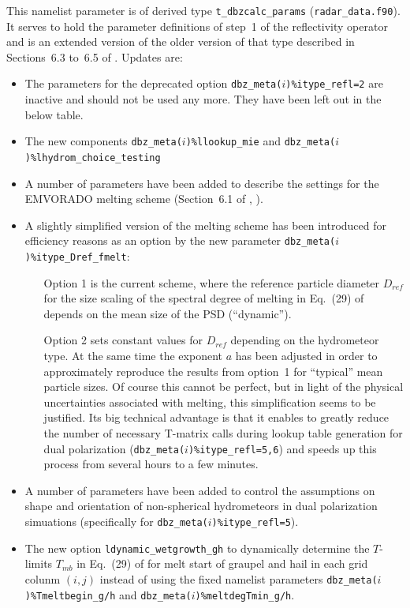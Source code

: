 \documentclass[10pt,a4paper,twoside,headinclude,footinclude,parskip=half]{scrartcl}
\newcommand{\citeP}[1]{\citet{#1}}
\newcommand{\citeNPK}[1]{\citeauthor{#1}, \citeyear{#1}}
\newcommand{\srcform}[1]{\mbox{\texttt{#1}}\xspace}%
\newcommand{\paramform}[1]{\mbox{\texttt{#1}}\xspace}%
\begin{document}
This namelist parameter is of derived type \srcform{t_dbzcalc_params} (\srcform{radar_data.f90}). It serves to hold the parameter definitions of step~1 of the reflectivity operator and is an extended version
of the older version of that type described in Sections~6.3 to~6.5 of \citeP{blahak2016a}. Updates are:
\begin{itemize}
\item The parameters for the deprecated option \paramform{dbz_meta($i$)\%itype_refl=2} are inactive and should not be used any more. They have been left out in the below table. 
\item The new components \paramform{dbz_meta($i$)\%llookup_mie} and \paramform{dbz_meta($i$)\%lhydrom_choice_testing} 
\item A number of parameters have been added to describe the settings for the EMVORADO melting scheme (Section~6.1 of \citeNPK{blahak2016a}).
\item A slightly simplified version of the melting scheme has been introduced for efficiency reasons as an option by the new parameter \paramform{dbz_meta($i$)\%itype_Dref_fmelt}:
  \begin{itemize}
  \item[Option 1] is the current scheme, where the reference particle diameter $D_{ref}$ for the size scaling of the spectral degree of melting in Eq.~(29) of \citeP{blahak2016a} depends on the mean size of the PSD (``dynamic'').
  \item[Option 2] sets constant values for $D_{ref}$ depending on the hydrometeor type. At the same time the exponent $a$ has been adjusted in order to approximately reproduce the results from option~1 for ``typical'' mean particle sizes.
    Of course this cannot be perfect, but in light of the physical uncertainties associated with melting, this simplification seems to be justified. Its big technical advantage is that it enables to greatly reduce the number of necessary T-matrix calls during lookup table generation for dual polarization (\paramform{dbz_meta($i$)\%itype_refl=5,6}) and speeds up this process from several hours to a few minutes.
  \end{itemize}
\item A number of parameters have been added to control the assumptions on shape and orientation of non-spherical hydrometeors in  dual polarization simuations (specifically for \paramform{dbz_meta($i$)\%itype_refl=5}).
\item The new option \paramform{ldynamic_wetgrowth_gh} to dynamically determine the $T$-limits $T_{mb}$ in Eq.~(29) of \citeP{blahak2016a} for melt start of graupel and hail in each grid colunm $(i,j)$ instead of using the fixed namelist parameters \paramform{dbz_meta($i$)\%Tmeltbegin_g/h} and \paramform{dbz_meta($i$)\%meltdegTmin_g/h}.

\end{itemize}
\end{document}
